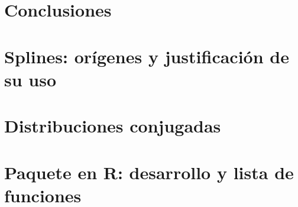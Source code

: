 \documentclass[pdftex,10pt, oneside]{book}
\theoremstyle{plain}
\theoremstyle{definition}
\begin{document}
\chapter{Conclusiones} \label{cap:Conclusiones}



\appendix
\chapter{Splines: orígenes y justificación de su uso} 
\label{ap:Splines}


\chapter{Distribuciones conjugadas} 
\label{ap:DistrosConjugadas}


\chapter{Paquete en R: desarrollo y lista de funciones} \label{ap:Paquete}


%

\backmatter
{}
\printbibliography
\end{document}
